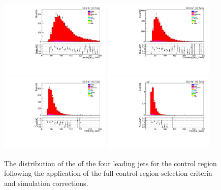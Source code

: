\begin{figure}[tbp]
\centering
\includegraphics[width=0.47\textwidth]{figs/background-estimation/plots/unblinded/ttbar_control/leadingJetPt_SingleTop_wMass_emu.pdf}
\includegraphics[width=0.47\textwidth]{figs/background-estimation/plots/unblinded/ttbar_control/secondJetPt_SingleTop_wMass_emu.pdf}
\\
\includegraphics[width=0.47\textwidth]{figs/background-estimation/plots/unblinded/ttbar_control/thirdJetPt_SingleTop_wMass_emu.pdf}
\includegraphics[width=0.47\textwidth]{figs/background-estimation/plots/unblinded/ttbar_control/fourthJetPt_SingleTop_wMass_emu.pdf}
\caption{
The distribution of the \pt of the four leading jets for the \ttbar control region following the application of the full control region selection criteria and simulation corrections.
}
\label{fig:ttbarCR_jetPt}
\end{figure}

